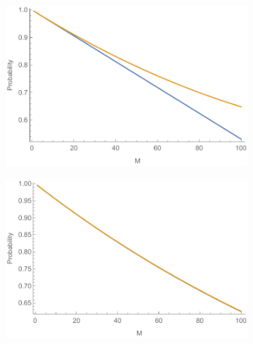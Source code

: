\documentclass[aps,pra,twocolumn,superscriptaddress,numerical,floatfix]{revtex4-1}
\begin{document}
\begin{figure}
	\begin{subfigure}[b]{.45\columnwidth}
		\includegraphics[width=\columnwidth]{Psuccess_c.pdf}
		\caption{}\label{fig:phase psuccess c}
	\end{subfigure}
	\begin{subfigure}[b]{.45\columnwidth}
		\includegraphics[width=\columnwidth]{Psuccess_d.pdf}
		\caption{}\label{fig:phase psuccess d}
	\end{subfigure}


\end{figure}
\end{document}
